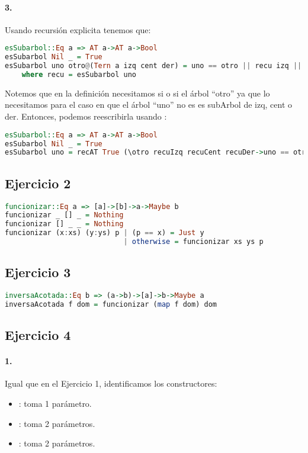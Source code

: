 \paragraph{3.} Usando recursión explicita tenemos que:

\begin{lstlisting}[language=Haskell]
esSubarbol::Eq a => AT a->AT a->Bool
esSubarbol Nil _ = True
esSubarbol uno otro@(Tern a izq cent der) = uno == otro || recu izq || recu cent || recu der
    where recu = esSubarbol uno
\end{lstlisting}

Notemos que en la definición necesitamos si o si el árbol ``otro'' ya que lo necesitamos para el caso en que el árbol ``uno'' no es es subArbol de izq, cent o der. Entonces, podemos reescribirla usando :

\begin{lstlisting}[language=Haskell]
esSubarbol::Eq a => AT a->AT a->Bool
esSubarbol Nil _ = True
esSubarbol uno = recAT True (\otro recuIzq recuCent recuDer->uno == otro || recuIzq || recuCent || recuDer)
\end{lstlisting}


\subsection*{Ejercicio 2}
\begin{lstlisting}[language=Haskell]
funcionizar::Eq a => [a]->[b]->a->Maybe b
funcionizar _ [] _ = Nothing
funcionizar [] _ _ = Nothing
funcionizar (x:xs) (y:ys) p | (p == x) = Just y
                            | otherwise = funcionizar xs ys p
\end{lstlisting}

\subsection*{Ejercicio 3}
\begin{lstlisting}[language=Haskell]
inversaAcotada::Eq b => (a->b)->[a]->b->Maybe a
inversaAcotada f dom = funcionizar (map f dom) dom
\end{lstlisting}

\subsection*{Ejercicio 4}
\paragraph{1.} Igual que en el Ejercicio 1, identificamos los constructores:
\begin{itemize}
  \item {}: toma 1 parámetro.
  \item {}: toma 2 parámetros.
  \item {}: toma 2 parámetros.
\end{itemize}

